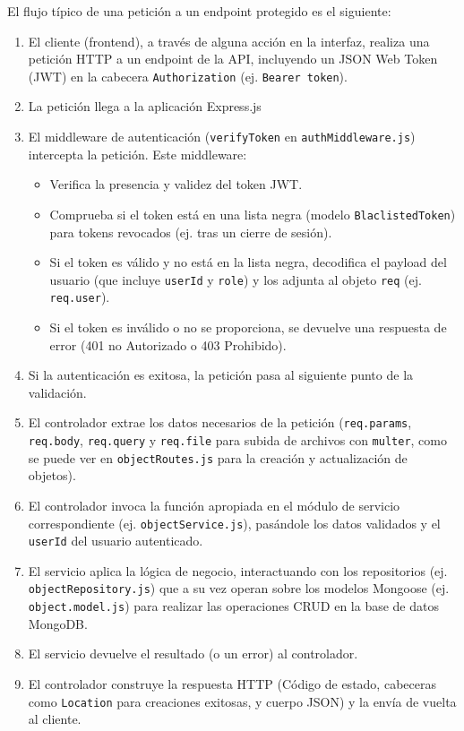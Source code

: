 El flujo típico de una petición a un endpoint protegido es el siguiente:
\begin{enumerate}
    \item El cliente (frontend), a través de alguna acción en la interfaz, realiza una petición HTTP a un endpoint de la API, incluyendo un JSON Web Token (JWT) en la cabecera \texttt{Authorization} (ej. \texttt{Bearer token}).
    \item La petición llega a la aplicación Express.js
    \item El middleware de autenticación (\texttt{verifyToken} en \texttt{authMiddleware.js})  intercepta la petición. Este middleware:
    \begin{itemize}
        \item Verifica la presencia y validez del token JWT.
        \item Comprueba si el token está en una lista negra (modelo \texttt{BlaclistedToken}) para tokens revocados (ej. tras un cierre de sesión).
        \item Si el token es válido y no está en la lista negra, decodifica el payload del usuario (que incluye \texttt{userId} y \texttt{role}) y los adjunta al objeto \texttt{req} (ej. \texttt{req.user}).
        \item Si el token es inválido o no se proporciona, se devuelve una respuesta de error (401 no Autorizado o 403 Prohibido).
    \end{itemize}
    \item Si la autenticación es exitosa, la petición pasa al siguiente punto de la validación.
    \item El controlador extrae los datos necesarios de la petición (\texttt{req.params}, \texttt{req.body}, \texttt{req.query} y \texttt{req.file} para subida de archivos con \texttt{multer}, como se puede ver en \texttt{objectRoutes.js} para la creación y actualización de objetos).
    \item El controlador invoca la función apropiada en el módulo de servicio correspondiente (ej. \texttt{objectService.js}), pasándole los datos validados y el \texttt{userId} del usuario autenticado.
    \item El servicio aplica la lógica de negocio, interactuando con los repositorios (ej. \texttt{objectRepository.js}) que a su vez operan sobre los modelos Mongoose (ej. \texttt{object.model.js}) para realizar las operaciones CRUD en la base de datos MongoDB.
    \item El servicio devuelve el resultado (o un error) al controlador.
    \item El controlador construye la respuesta HTTP (Código de estado, cabeceras como \texttt{Location} para creaciones exitosas, y cuerpo JSON) y la envía de vuelta al cliente.
\end{enumerate}

